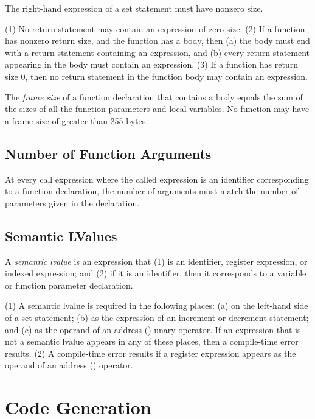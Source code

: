 \documentclass[10pt]{article}
\begin{document}
 The right-hand expression of a set statement
must have nonzero size.

 (1) No return statement may contain an
expression of zero size.  (2) If a function has nonzero return size,
and the function has a body, then (a) the body must end with a return
statement containing an expression, and (b) every return statement
appearing in the body must contain an expression.  (3) If a function
has return size 0, then no return statement in the function body may
contain an expression.

 The \emph{frame size} of a function
declaration that contains a body equals the sum of the sizes of all
the function parameters and local variables.  No function may have a
frame size of greater than 255 bytes.



\subsection{Number of Function Arguments}
\label{sec:semantics:fn-args}

At every call expression where the called expression is an identifier
corresponding to a function declaration, the number of arguments must
match the number of parameters given in the declaration.

\subsection{Semantic LValues}
\label{sec:semantics:lvalues}

  A \emph{semantic lvalue} is
an expression that (1) is an identifier, register expression, or
indexed expression; and (2) if it is an identifier, then it
corresponds to a variable or function parameter declaration.

  (1) A semantic lvalue is
required in the following places: (a) on the left-hand side of a set
statement; (b) as the expression of an increment or decrement
statement; and (c) as the operand of an address () unary
operator.  If an expression that is not a semantic lvalue appears in
any of these places, then a compile-time error results.  (2) A
compile-time error results if a register expression appears as the
operand of an address () operator.


\section{Code Generation}
\label{sec:code-gen}
\end{document}
